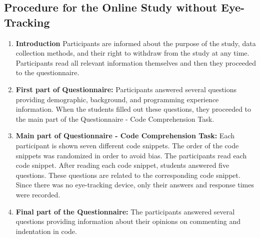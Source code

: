\subsection{Procedure for the Online Study without Eye-Tracking}


\begin{enumerate}
    \item \textbf{Introduction} Participants are informed about the purpose of the study, data collection methods, and their right to withdraw from the study at any time. Participants read all relevant information themselves and then they proceeded to the questionnaire.
    
    \item \textbf{First part of Questionnaire:}
    Participants answered several questions providing demographic, background, and programming experience information. When the students filled out these questions, they proceeded to the main part of the Questionnaire - Code Comprehension Task.

    \item \textbf{Main part of Questionnaire - Code Comprehension Task:} Each participant is shown seven different code snippets. The order of the code snippets was randomized in order to avoid bias. The participants read each code snippet. After reading each code snippet, students answered five questions. These questions are related to the corresponding code snippet. Since there was no eye-tracking device, only their answers and response times were recorded.

    \item \textbf{Final part of the Questionnaire:}
    The participants answered several questions providing information about their opinions on commenting and indentation in code.
\end{enumerate}



